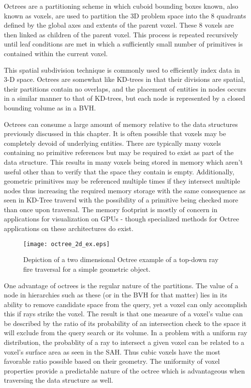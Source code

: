 Octrees are a partitioning scheme in which cuboid bounding boxes known, also
known as voxels, are used to partition the 3D problem space into the 8 quadrants
defined by the global axes and extents of the parent voxel. These 8 voxels are
then linked as children of the parent voxel. This process is repeated
recursively until leaf conditions are met in which a sufficiently small number
of primitives is contained within the current voxel.

This spatial subdivision technique is commonly used to efficiently index
data in 3-D space.\cite{Glassner_1989} Octrees are somewhat like KD-trees in
that their divisions are spatial, their partitions contain no overlaps, and the
placement of entities in nodes occurs in a similar manner to that of KD-trees,
but each node is represented by a closed bounding volume as in a BVH.

Octrees can consume a large amount of memory relative to the data
structures previously discussed in this chapter. It is often possible that
voxels may be completely devoid of underlying entities. There are typically many
voxels containing no primitive references but may be required to exist as part
of the data structure. This results in many voxels being stored in memory which
aren't useful other than to verify that the space they contain is
empty. Additionally, geometric primitives may be referenced multiple times if
they intersect multiple nodes thus increasing the required memory storage with
the same consequence as seen in KD-Tree traversl with the possibility of a
primitive being checked more than once upon traversal. The memory footprint is
mostly of concern in applications for visualization on GPUs - though specialized methods for Octree applications on these architectures do exist.

\begin{figure}[H]
  \centering
  \texttt{[image: octree\_2d\_ex.eps]}
  \caption{Depiction of a two dimensional Octree example of a top-down ray fire traversal for a simple geometric object.}
  \label{fig:2D_octree}
\end{figure}

One advantage of octrees is the regular nature of the partitions. The value of a
node in hierarchies such as these (or in the BVH for that matter) lies in its
ability to remove candidate space from the query, yet a voxel can only
accomplish this if rays strike the voxel. The result is that one measure of a
voxel's value can be described by the ratio of its probability of an
intersection check to the space it will exclude from the query search or its
volume. In a problem with a uniform ray distribution, the probablity of a ray to
intersect a given voxel can be related to a voxel's surface area as seen in the
SAH. Thus cubic voxels have the most favorable ratio possible based on their
geometry. The uniformity of voxel properties provide a predictable nature of the
octree which is advantageous when traversing the data structure as well.

